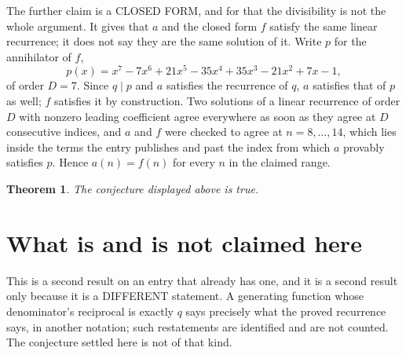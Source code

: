 \documentclass[11pt,a4paper]{article}
\theoremstyle{plain}
\newtheorem{theorem}{Theorem}
\theoremstyle{definition}
\begin{document}
The further claim is a CLOSED FORM, and for that the divisibility is not the whole argument. It
gives that $a$ and the closed form $f$ satisfy the same linear recurrence; it does not say they
are the same solution of it. Write $p$ for the annihilator of $f$,
\[
  p(x)=x^{7} - 7 x^{6} + 21 x^{5} - 35 x^{4} + 35 x^{3} - 21 x^{2} + 7 x - 1 ,
\]
of order $D=7$. Since $q\mid p$ and $a$ satisfies the recurrence of $q$, $a$ satisfies that of
$p$ as well; $f$ satisfies it by construction. Two solutions of a linear recurrence of order $D$
with nonzero leading coefficient agree everywhere as soon as they agree at $D$ consecutive
indices, and $a$ and $f$ were checked to agree at $n=8,\dots,14$,
which lies inside the terms the entry publishes and past the index from which $a$ provably
satisfies $p$. Hence $a(n)=f(n)$ for every $n$ in the claimed range.

\begin{theorem}
The conjecture displayed above is true.
\end{theorem}

\section{What is and is not claimed here}

This is a second result on an entry that already has one, and it is a second result only because
it is a DIFFERENT statement. A generating function whose denominator's reciprocal is exactly $q$
says precisely what the proved recurrence says, in another notation; such restatements are
identified and are not counted. The conjecture settled here is not of that kind.
\end{document}
